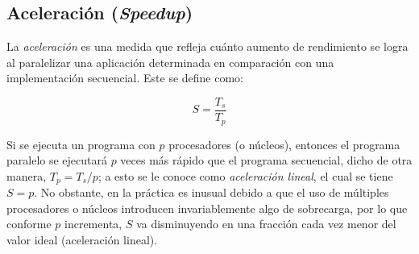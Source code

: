 \subsection{Aceleración (\textit{Speedup})}
\label{section:acel}

La \emph{aceleración} es una medida que refleja cuánto aumento de rendimiento se logra al paralelizar una aplicación determinada en comparación con una implementación secuencial. Este se define como:

\[S = \frac{T_s}{T_p}\]

Si se ejecuta un programa con $p$ procesadores (o núcleos), entonces el programa paralelo se ejecutará $p$ veces más rápido que el programa secuencial, dicho de otra manera, $T_p = T_s / p$; a esto se le conoce como \emph{aceleración lineal}, el cual se tiene $S = p$. No obstante, en la práctica es inusual debido a que el uso de múltiples procesadores o núcleos introducen invariablemente algo de sobrecarga, por lo que conforme $p$ incrementa, $S$ va disminuyendo en una fracción cada vez menor del valor ideal (aceleración lineal). \cite{pacheco2011introduction}